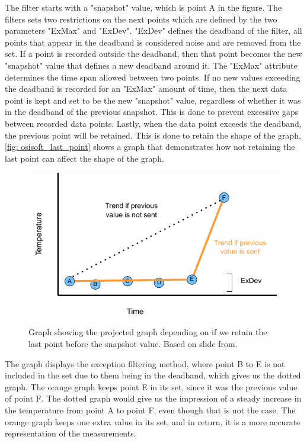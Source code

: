 \documentclass[main.tex]{subfiles}
\begin{document}
The filter starts with a "snapshot" value, which is point A in the figure. The filters sets two restrictions on the next points which are defined by the two parameters "ExMax" and "ExDev". "ExDev" defines the deadband of the filter, all points that appear in the deadband is considered noise and are removed from the set. If a point is recorded outside the deadband, then that point becomes the new "snapshot" value that defines a new deadband around it. The "ExMax" attribute determines the time span allowed between two points. If no new values exceeding the deadband is recorded for an "ExMax" amount of time, then the next data point is kept and set to be the new "snapshot" value, regardless of whether it was in the deadband of the previous snapshot. This is done to prevent excessive  gaps between recorded data points. Lastly, when the data point exceeds the deadband, the previous point will be retained. This is done to retain the shape of the graph, \autoref{fig: osisoft_last_point} shows a graph that demonstrates how not retaining the last point can affect the shape of the graph.

\begin{figure}[!htpb]
    \centering
    \includegraphics[width=12cm, scale=4]{images/exception_process_2.pdf}
    \caption{Graph showing the projected graph depending on if we retain the last point before the snapshot value. Based on slide from\cite{osisoft_exception}.}
    \label{fig: osisoft_last_point}
\end{figure}
\FloatBarrier 
 
The graph displays the exception filtering method, where point B to E is not included in the set due to them being in the deadband, which gives us the dotted graph. The orange graph keeps point E in its set, since it was the previous value of point F. The dotted graph would give us the impression of a steady increase in the temperature from point A to point F, even though that is not the case. The orange graph keeps one extra value in its set, and in return, it is a more accurate representation of the measurements.
 
\end{document}
